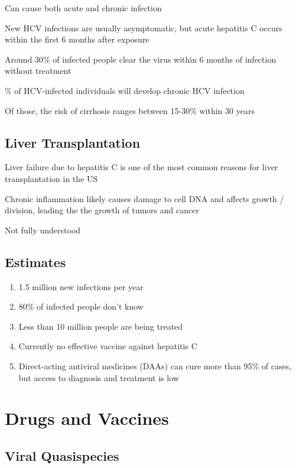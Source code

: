 \documentclass{notes}
\begin{document}
Can cause both acute and chronic infection

New HCV infections are usually asymptomatic, but acute hepatitis C occurs within the first 6 months after exposure

\tab \indicates Around 30\% of infected people clear the virus within 6 months of infection without treatment

\tab {}\% of HCV-infected individuals will develop chronic HCV infection

\tab \tab Of those, the risk of cirrhosis ranges between 15-30\% within 30 years

\subsection{Liver Transplantation}

Liver failure due to hepatitis C is one of the most common reasons for liver transplantation in the US

Chronic inflammation likely causes damage to cell DNA and affects growth / division, leading the the growth of tumors and cancer

\tab Not fully understood

\subsection{Estimates}

\begin{enumerate}
    \item 1.5 million new infections per year
    \item 80\% of infected people don't know
    \item Less than 10 million people are being treated
    \item Currently no effective vaccine against hepatitis C
    \item Direct-acting antiviral medicines (DAAs) can cure more than 95\% of cases, but access to diagnosis and treatment is low
\end{enumerate}

\section{Drugs and Vaccines}

\subsection{Viral Quasispecies}
\end{document}
